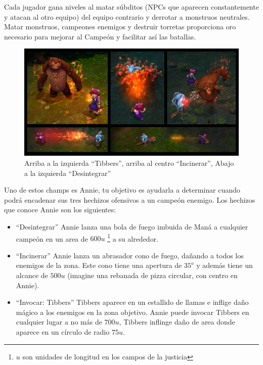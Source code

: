 \documentclass[letter,10pt]{article}
\begin{document}
Cada jugador gana niveles al matar súbditos (NPCs que aparecen constantemente y atacan al otro equipo) del equipo contrario y derrotar a monstruos neutrales. Matar monstruos, campeones enemigos y destruir torretas proporciona oro necesario para mejorar al Campeón y facilitar así las batallas.

\begin{figure}[H]
\centering
\includegraphics[keepaspectratio=true,scale=0.2]{Annie_comic.jpg}
\caption{Arriba a la izquierda ``Tibbers'', arriba al centro ``Incinerar'', Abajo a la 
izquierda ``Desintegrar''}
\label{fig:my_label}
\end{figure}

Uno de estos champs es Annie, tu objetivo es ayudarla a determinar cuando podrá 
encadenar sus tres hechizos ofensivos a un campeón enemigo. Los hechizos que conoce Annie son los siguientes:
\begin{itemize}
\item ``Desintegrar'' Annie lanza una bola de fuego imbuida de Maná a cualquier campeón en un area de $600 u$ \footnote{$u$ son unidades de longitud en los campos de la justicia} a su alrededor.$$$$$$$$
$$$$$$$$$$$$$$$$
$$$$$$$$

\item ``Incinerar'' Annie lanza un abrasador cono de fuego, dañando a todos los enemigos de la zona. Este cono tiene una apertura de $35^o$  y además tiene un 
alcance de $500u$ (imagine una rebanada de pizza circular, con centro en Annie).

\item ``Invocar: Tibbers'' Tibbers aparece en un estallido de llamas e inflige 
daño mágico a los enemigos en la zona objetivo. Annie puede invocar Tibbers en 
cualquier lugar a no más de $700u$, Tibbers inflinge daño de area donde aparece en
un círculo de radio $75u$.
\end{itemize}
\end{document}

